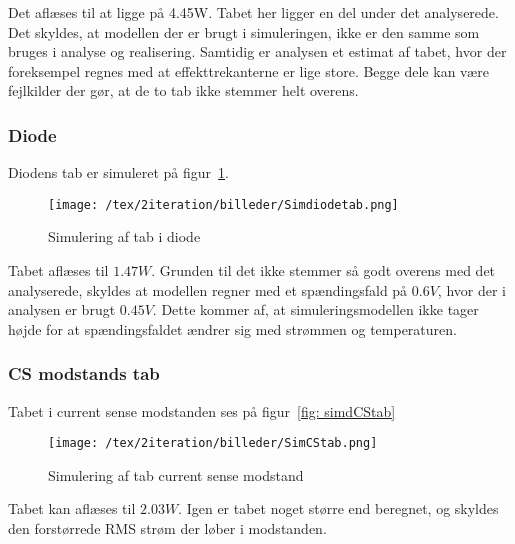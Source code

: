 Det aflæses til at ligge på 4.45W. Tabet her ligger en del  under det analyserede. Det skyldes, at modellen der er brugt i simuleringen, ikke er den samme som bruges i analyse og realisering. Samtidig er analysen et estimat af tabet, hvor der foreksempel regnes med at effekttrekanterne er lige store. Begge dele kan være fejlkilder der gør, at de to tab ikke stemmer helt overens.  

\subsubsection{Diode}
\noindent Diodens tab er simuleret på figur~\ref{fig: simdiodetab}. 
\begin{figure}[H]
	\center
	\texttt{[image: /tex/2iteration/billeder/Simdiodetab.png]}
	\caption{Simulering af tab i diode}
	\label{fig: simdiodetab}
\end{figure}
Tabet aflæses til $1.47W$. Grunden til det ikke stemmer så godt overens med det analyserede, skyldes at modellen regner med et spændingsfald på $0.6V$, hvor der i analysen er brugt $0.45V$. Dette kommer af, at simuleringsmodellen ikke tager højde for at spændingsfaldet ændrer sig med strømmen og temperaturen. 

\subsubsection{CS modstands tab}
\noindent Tabet i current sense modstanden ses på figur~\ref{fig: simdCStab}
\begin{figure}[H]
	\center
	\texttt{[image: /tex/2iteration/billeder/SimCStab.png]}
	\caption{Simulering af tab current sense modstand}
	\label{fig: simCStab}
\end{figure}
Tabet kan aflæses til $2.03W$. Igen er tabet noget større end beregnet, og skyldes den forstørrede RMS strøm der løber i modstanden.

